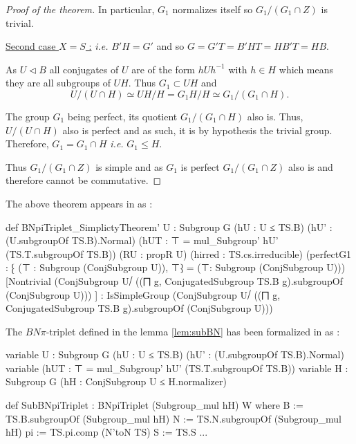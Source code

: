 \begin{proof}[Proof of the theorem]
     In particular, $G_1$ normalizes itself so $G_1 / \left( G_1 \cap Z \right)$ is trivial.

    \underline {Second case $X = S$ :} \textit{i.e.} $B'H = G'$ and so $G = G'T= B'HT = HB'T = HB.$

       As $U \triangleleft B$ all conjugates of $U$ are of the form $h U h^{-1}$ with $h \in  H$ which means they are all subgroups of $UH$. Thus $G_1 \subset UH$ and 
       $$U / \left( U \cap  H \right) \simeq UH / H = G_1H / H \simeq G_1 / \left( G_1 \cap H \right).$$

The group $G_1$ being perfect, its quotient $G_1 / \left( G_1 \cap H \right)$ also is. Thus, $U / (U \cap H)$ also is perfect and as such, it is by hypothesis the trivial group. Therefore, $G_1 = G_1 \cap H$ \textit{i.e.} $ G_1 \le H$.

Thus $G_1 / \left( G_1 \cap Z \right)$ is simple and as $G_1$ is perfect $G_1 / \left( G_1 \cap Z \right)$ also is and therefore cannot be commutative.
\end{proof}

The above theorem appears in \Lean as :
\begin{leancode}
def BNpiTriplet_SimplictyTheorem'  {U : Subgroup G} (hU : U ≤ TS.B) (hU' : (U.subgroupOf TS.B).Normal) 
 (hUT : ⊤ = mul_Subgroup' hU' (TS.T.subgroupOf TS.B)) (RU : propR U) (hirred : TS.cs.irreducible)
  (perfectG1 : ⁅ (⊤ : Subgroup (ConjSubgroup U)), ⊤⁆ = (⊤: Subgroup (ConjSubgroup U)))
   [Nontrivial (ConjSubgroup U⧸ ((⨅ g, ConjugatedSubgroup TS.B g).subgroupOf (ConjSubgroup U))) ] :
    IsSimpleGroup (ConjSubgroup U⧸ ((⨅ g, ConjugatedSubgroup TS.B g).subgroupOf (ConjSubgroup U)))
\end{leancode}

\begin{remark}
    The $BN\pi$-triplet defined in the lemma \ref{lem:subBN} has been formalized in \Lean as :

\begin{leancode}
variable {U : Subgroup G} (hU : U ≤ TS.B) (hU' : (U.subgroupOf TS.B).Normal)
variable (hUT : ⊤ = mul_Subgroup' hU' (TS.T.subgroupOf TS.B))
variable {H : Subgroup G} (hH : ConjSubgroup U ≤ H.normalizer)

def SubBNpiTriplet : BNpiTriplet (Subgroup_mul  hH) W where
  B := TS.B.subgroupOf (Subgroup_mul hH)
  N := TS.N.subgroupOf (Subgroup_mul hH)
  pi := TS.pi.comp (N'toN TS)
  S := TS.S
  ... 
\end{leancode}
\end{remark}

